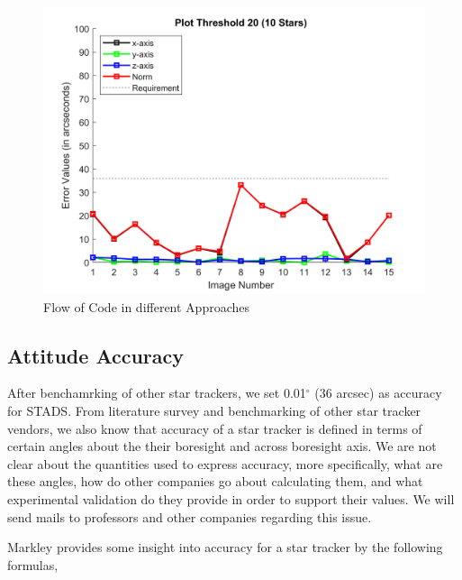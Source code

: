 \documentclass[../../main.tex]{subfiles}
\begin{document}
{{{\begin{figure}
\includegraphics[scale=0.50]{Figures/GNC/Result_Plot_Threshold_20_10stars.png}
\caption{Flow of Code in different Approaches}
\label{sec:esti_result_variation}
\end{figure}
}

}


\subsection{Attitude Accuracy} %
\label{sec:Atti_Accu}
{
After benchamrking of other star trackers, we set 0.01$^\circ$ (36 arcsec) as accuracy for STADS. From literature survey and benchmarking of other star tracker vendors, we also know that accuracy of a star tracker is defined in terms of certain angles about the their boresight and across boresight axis. We are not clear about the quantities used to express accuracy, more specifically, what are these angles, how do other companies go about calculating them, and what experimental validation do they provide in order to support their values. We will send mails to professors and other companies regarding this issue.

Markley\cite{markley2014fundamentals} provides some insight into accuracy for a star tracker by the following formulas,

}}
\end{document}
